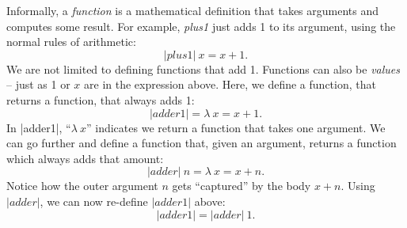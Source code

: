 \documentclass[12pt]{report}
\begin{document}










 

Informally, a \emph{function} is a mathematical definition that takes
arguments and computes some result. For example, \emph{plus1} just adds 1 
to its argument, using the normal rules of arithmetic:
\begin{equation}
  |plus1|\ x = x + 1.
\end{equation}
We are not limited to defining functions that add 1. Functions can
also be \emph{values} -- just as 1 or $x$ are in the expression
above. Here, we define a function, that returns a function, that always
adds 1:
\begin{equation}
  |adder1| = \lambda\ x = x + 1.
\end{equation}
In |adder1|, ``$\lambda\ x$'' indicates we return a function that takes one
argument. We can go further and define a function that, given an
argument, returns a function which always adds that amount:
\begin{equation}
  |adder|\ n = \lambda\ x = x + n.
\end{equation}
Notice how the outer argument $n$ gets ``captured'' by the body $x +
n$. Using $|adder|$, we can now re-define $|adder1|$ above:
\begin{equation}
  |adder1| = |adder|\ 1.
\end{equation}
\end{document}

